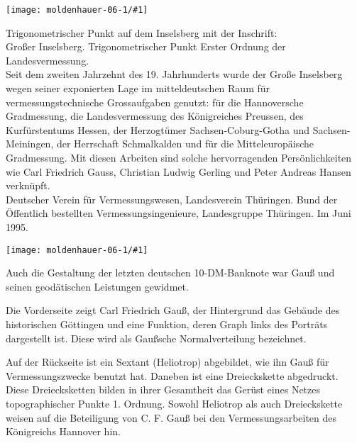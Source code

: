 \documentclass[10pt]{article}
\newcommand{\Bild}[2]{
  \begin{center}
    \texttt{[image: moldenhauer-06-1/\#1]}
  \end{center}
}
\begin{document}
\begin{minipage}{.3\textwidth}
  \Bild{Inselsberg_Trig.jpg}{1.0}
\end{minipage}\hfill
\begin{minipage}{.65\textwidth}
Trigonometrischer Punkt auf dem Inselsberg mit der
Inschrift\footnotemark:\\[4pt] Großer Inselsberg. Trigonometrischer Punkt
Erster Ordnung der Landesvermessung.\\[4pt] Seit dem zweiten Jahrzehnt des
19. Jahrhunderts wurde der Große Inselsberg wegen seiner exponierten Lage im
mitteldeutschen Raum für vermessungstechnische Grossaufgaben genutzt: für die
Hannoversche Gradmessung, die Landesvermessung des Königreiches Preussen, des
Kurfürstentums Hessen, der Herzogtümer Sachsen-Coburg-Gotha und
Sachsen-Meiningen, der Herrschaft Schmalkalden und für die Mitteleuropäische
Gradmessung. Mit diesen Arbeiten sind solche hervorragenden Persönlichkeiten
wie Carl Friedrich Gauss, Christian Ludwig Gerling und Peter Andreas Hansen
verknüpft.\\[4pt] Deutscher Verein für Vermessungswesen, Landesverein
Thüringen.  Bund der Öffentlich bestellten Vermessungsingenieure, Landesgruppe
Thüringen.  Im Juni 1995.
\end{minipage}

\bigskip

\begin{minipage}{0.3\textwidth}
  \Bild{gauss_10DM.jpg}{1.0}
\end{minipage}\hfill
\begin{minipage}{0.65\textwidth}
Auch die Gestaltung der letzten deutschen 10-DM-Banknote war Gauß und seinen
geodätischen Leistungen gewidmet.

Die Vorderseite zeigt Carl Friedrich Gauß, der Hintergrund das Gebäude des
historischen Göttingen und eine Funktion, deren Graph links des Porträts
dargestellt ist. Diese wird als Gaußsche Normalverteilung bezeichnet.

Auf der Rückseite ist ein Sextant (Heliotrop) abgebildet, wie ihn Gauß für
Vermessungszwecke benutzt hat. Daneben ist eine Dreieckskette abgedruckt.
Diese Dreiecksketten bilden in ihrer Gesamtheit das Gerüst eines Netzes
topographischer Punkte 1. Ordnung. Sowohl Heliotrop als auch Dreieckskette
weisen auf die Beteiligung von C. F. Gauß bei den Vermessungsarbeiten des
Königreichs Hannover hin.
\end{minipage}
\end{document}
